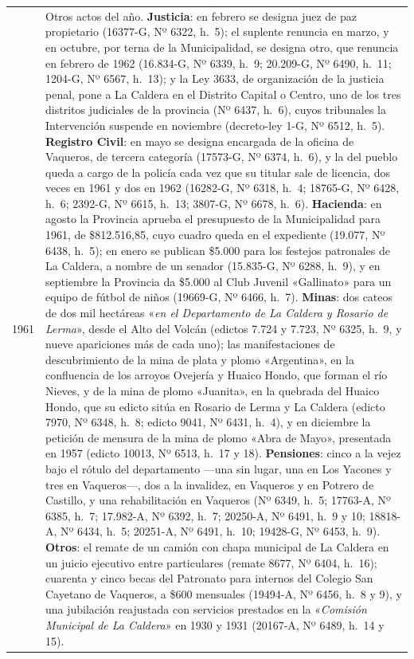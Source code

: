 \begin{longtable}{@{}p{2.7cm}p{10.3cm}@{}}
1961 & Otros actos del año. \textbf{Justicia}: en febrero se designa juez de paz propietario (16377-G, Nº 6322, h.\ 5); el suplente renuncia en marzo, y en octubre, por terna de la Municipalidad, se designa otro, que renuncia en febrero de 1962 (16.834-G, Nº 6339, h.\ 9; 20.209-G, Nº 6490, h.\ 11; 1204-G, Nº 6567, h.\ 13); y la Ley 3633, de organización de la justicia penal, pone a La Caldera en el Distrito Capital o Centro, uno de los tres distritos judiciales de la provincia (Nº 6437, h.\ 6), cuyos tribunales la Intervención suspende en noviembre (decreto-ley 1-G, Nº 6512, h.\ 5). \textbf{Registro Civil}: en mayo se designa encargada de la oficina de Vaqueros, de tercera categoría (17573-G, Nº 6374, h.\ 6), y la del pueblo queda a cargo de la policía cada vez que su titular sale de licencia, dos veces en 1961 y dos en 1962 (16282-G, Nº 6318, h.\ 4; 18765-G, Nº 6428, h.\ 6; 2392-G, Nº 6615, h.\ 13; 3807-G, Nº 6678, h.\ 6). \textbf{Hacienda}: en agosto la Provincia aprueba el presupuesto de la Municipalidad para 1961, de \$812.516,85, cuyo cuadro queda en el expediente (19.077, Nº 6438, h.\ 5); en enero se publican \$5.000 para los festejos patronales de La Caldera, a nombre de un senador (15.835-G, Nº 6288, h.\ 9), y en septiembre la Provincia da \$5.000 al Club Juvenil «Gallinato» para un equipo de fútbol de niños (19669-G, Nº 6466, h.\ 7). \textbf{Minas}: dos cateos de dos mil hectáreas «\textit{en el Departamento de La Caldera y Rosario de Lerma}», desde el Alto del Volcán (edictos 7.724 y 7.723, Nº 6325, h.\ 9, y nueve apariciones más de cada uno); las manifestaciones de descubrimiento de la mina de plata y plomo «Argentina», en la confluencia de los arroyos Ovejería y Huaico Hondo, que forman el río Nieves, y de la mina de plomo «Juanita», en la quebrada del Huaico Hondo, que su edicto sitúa en Rosario de Lerma y La Caldera (edicto 7970, Nº 6348, h.\ 8; edicto 9041, Nº 6431, h.\ 4), y en diciembre la petición de mensura de la mina de plomo «Abra de Mayo», presentada en 1957 (edicto 10013, Nº 6513, h.\ 17 y 18). \textbf{Pensiones}: cinco a la vejez bajo el rótulo del departamento ---una sin lugar, una en Los Yacones y tres en Vaqueros---, dos a la invalidez, en Vaqueros y en Potrero de Castillo, y una rehabilitación en Vaqueros (Nº 6349, h.\ 5; 17763-A, Nº 6385, h.\ 7; 17.982-A, Nº 6392, h.\ 7; 20250-A, Nº 6491, h.\ 9 y 10; 18818-A, Nº 6434, h.\ 5; 20251-A, Nº 6491, h.\ 10; 19428-G, Nº 6453, h.\ 9). \textbf{Otros}: el remate de un camión con chapa municipal de La Caldera en un juicio ejecutivo entre particulares (remate 8677, Nº 6404, h.\ 16); cuarenta y cinco becas del Patronato para internos del Colegio San Cayetano de Vaqueros, a \$600 mensuales (19494-A, Nº 6456, h.\ 8 y 9), y una jubilación reajustada con servicios prestados en la «\textit{Comisión Municipal de La Caldera}» en 1930 y 1931 (20167-A, Nº 6489, h.\ 14 y 15). \\

\end{longtable}
